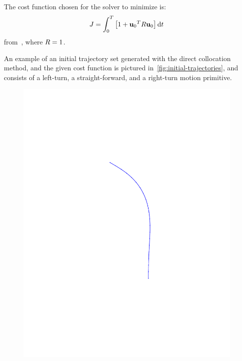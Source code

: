 The cost function chosen for the solver to minimize is:
\begin{equation}
  J = \int_{0}^{T} \left[ 1 + {\mathsf{\mathbf{u}}_{0}}^{T} R \mathsf{\mathbf{u}}_{0} \right] \mathrm{d}t
\end{equation}
from~\cite{majumdarRobustOnlineMotion2013}, where \(R = 1\).

An example of an initial trajectory set generated with the direct collocation
method, and the given cost function is pictured
in~\cref{fig:initial-trajectories}, and consists of a left-turn, a
straight-forward, and a right-turn motion primitive.

\begin{figure}
  \begin{minipage}[b]{0.3\textwidth}
    \includegraphics[trim={5cm 5cm 5cm 5cm},
    width=\textwidth]{figures/method/left-trajector}
  \end{minipage}
  \hfill
  \begin{minipage}[b]{0.3\textwidth}

\end{minipage}
\end{figure}
